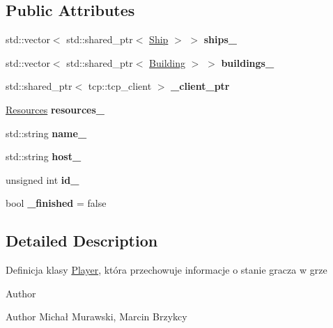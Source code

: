 \subsection*{Public Attributes}
\begin{DoxyCompactItemize}
\item 
std\+::vector$<$ std\+::shared\+\_\+ptr$<$ \hyperlink{classShip}{Ship} $>$ $>$ {\bfseries ships\+\_\+}\hypertarget{classPlayer_a52ebeef62bb950415a79909a6d50f6f7}{}\label{classPlayer_a52ebeef62bb950415a79909a6d50f6f7}

\item 
std\+::vector$<$ std\+::shared\+\_\+ptr$<$ \hyperlink{classBuilding}{Building} $>$ $>$ {\bfseries buildings\+\_\+}\hypertarget{classPlayer_ae9978fe9975e3d4f953a3b227af8b2f7}{}\label{classPlayer_ae9978fe9975e3d4f953a3b227af8b2f7}

\item 
std\+::shared\+\_\+ptr$<$ tcp\+::tcp\+\_\+client $>$ {\bfseries \+\_\+client\+\_\+ptr}\hypertarget{classPlayer_ae4887553567f66c9114eeede1123cee8}{}\label{classPlayer_ae4887553567f66c9114eeede1123cee8}

\item 
\hyperlink{classResources}{Resources} {\bfseries resources\+\_\+}\hypertarget{classPlayer_a45a1c81404c7622e80eba7dede5a2a36}{}\label{classPlayer_a45a1c81404c7622e80eba7dede5a2a36}

\item 
std\+::string {\bfseries name\+\_\+}\hypertarget{classPlayer_ae48b626fa81cdf4fe831c20122287649}{}\label{classPlayer_ae48b626fa81cdf4fe831c20122287649}

\item 
std\+::string {\bfseries host\+\_\+}\hypertarget{classPlayer_a4fb6eccf87c3555f2023ed519c88e9ef}{}\label{classPlayer_a4fb6eccf87c3555f2023ed519c88e9ef}

\item 
unsigned int {\bfseries id\+\_\+}\hypertarget{classPlayer_a37144a57b1fb28ef20eea5fff1d8d506}{}\label{classPlayer_a37144a57b1fb28ef20eea5fff1d8d506}

\item 
bool {\bfseries \+\_\+finished} = false\hypertarget{classPlayer_a8c8bf83771c911c579908d57d20e4255}{}\label{classPlayer_a8c8bf83771c911c579908d57d20e4255}

\end{DoxyCompactItemize}


\subsection{Detailed Description}
Definicja klasy \hyperlink{classPlayer}{Player}, która przechowuje informacje o stanie gracza w grze \begin{DoxyAuthor}{Author}

\end{DoxyAuthor}
\begin{DoxyParagraph}{Author}
Michał Murawski, Marcin Brzykcy 
\end{DoxyParagraph}


